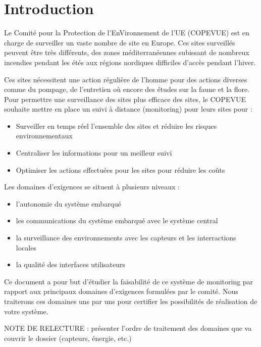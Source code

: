\section{Introduction}

Le Comité pour la Protection de l'EnVironnement de l'UE (COPEVUE) est en charge de surveiller un vaste nombre de site en Europe. Ces sites surveillés peuvent être très différents, des zones méditerranéennes subissant de nombreux incendies pendant les étés aux régions nordiques difficiles d'accès pendant l'hiver. 

Ces sites nécessitent une action régulière de l'homme pour des actions diverses comme du pompage, de l'entretien où encore des études sur la faune et la flore. Pour permettre une surveillance des sites plus efficace des sites, le COPEVUE souhaite mettre en place un suivi à distance (monitoring) pour leurs sites pour : 

\begin{itemize}
\item Surveiller en temps réel l'ensemble des sites et réduire les risques environnementaux
\item Centraliser les informations pour un meilleur suivi
\item Optimiser les actions effectuées pour les sites pour réduire les coûts
\end{itemize}

Les domaines d'exigences se situent à plusieurs niveaux : 

\begin{itemize}
\item l'autonomie du système embarqué
\item les communications du système embarqué avec le système central
\item la surveillance des environnements avec les capteurs et les interractions locales
\item la qualité des interfaces utilisateurs
\end{itemize}

Ce document a pour but d'étudier la faisabilité de ce système de monitoring par rapport aux principaux domaines d'exigences formulées par le comité. Nous traiterons ces domaines uns par uns pour certifier les possibilités de réalisation de votre système.

NOTE DE RELECTURE : présenter l'ordre de traitement des domaines que va
couvrir le dossier (capteurs, énergie, etc.)
